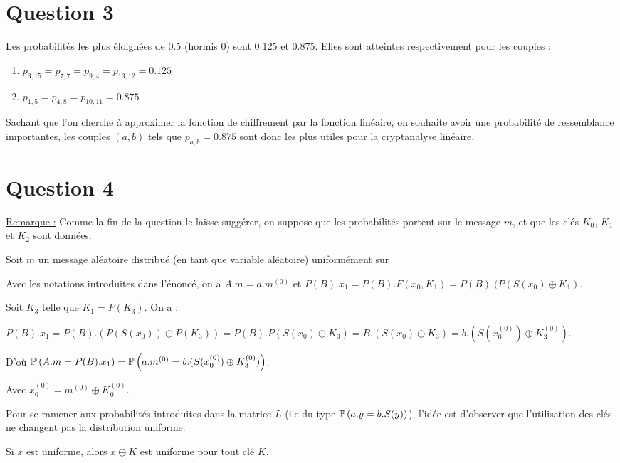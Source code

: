 \section*{Question 3}

Les probabilités les plus éloignées de 0.5 (hormis 0) sont 0.125 et 0.875.
Elles sont atteintes respectivement pour les couples :
\begin{enumerate}
\item $p_{3,15} = p_{7,7} = p_{9,4} = p_{13,12} = 0.125$
\item $p_{1,5} = p_{4,8} = p_{10,11} = 0.875$
\end{enumerate}

Sachant que l'on cherche à approximer la fonction de chiffrement par la fonction linéaire, on souhaite avoir une probabilité de ressemblance importantes, les couples $(a,b)$ tels que $p_{a,b} = 0.875$ sont donc les plus utiles pour la cryptanalyse linéaire.

\section*{Question 4}

\underline{Remarque :} Comme la fin de la question le laisse suggérer, on suppose que les probabilités portent sur le message $m$, et que les clés $K_0$, $K_1$ et $K_2$ sont données.

Soit $m$ un message aléatoire distribué (en tant que variable aléatoire) uniformément sur %

Avec les notations introduites dans l'énoncé, on a $A.m = a.m^{(0)}$ et $P(B).x_1 = P(B).F(x_0,K_1) = P(B).(P(S(x_0)\oplus K_1)$.

Soit $K_3$ telle que $K_1 = P(K_3)$. On a :

$P(B).x_1 = P(B).(P(S(x_0))\oplus P(K_3)) = P(B).P(S(x_0) \oplus K_3) = B.(S(x_0) \oplus K_3) = b.(S(x_0^{(0)}) \oplus K_3^{(0)})$.

D'où $\mathbb{P}\left( A.m = P(B).x_1 \right) = \mathbb{P}\left( a.m^{(0)}= b.(S(x_0^{(0)}) \oplus K_3^{(0)}) \right)$.

Avec $x_0^{(0)} = m^{(0)} \oplus K_0^{(0)}$.

Pour se ramener aux probabilités introduites dans la matrice $L$ (i.e du type $\mathbb{P}\left( a.y = b.S(y) \right)$), l'idée est d'observer que l'utilisation des clés ne changent pas la distribution uniforme.

\begin{lemma}
	Si $x$ est uniforme, alors $x \oplus K$ est uniforme pour tout clé $K$.
\end{lemma}

